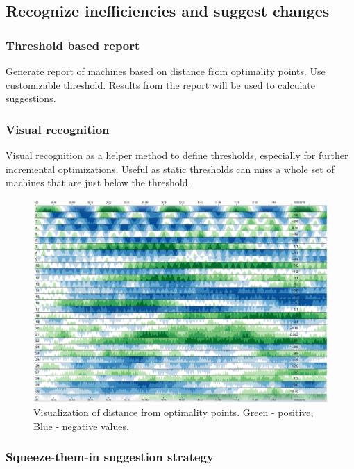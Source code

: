 \documentclass[]{final_report}
\begin{document}
\subsection{Recognize inefficiencies and suggest changes}

\subsubsection{Threshold based report}

Generate report of machines based on distance from optimality points. Use customizable threshold. 
Results from the report will be used to calculate suggestions.

\subsubsection{Visual recognition}

Visual recognition as a helper method to define thresholds, especially for further incremental optimizations. 
Useful as static thresholds can miss a whole set of machines that are just below the threshold. 


\begin{figure}[H]
       \includegraphics[width=\linewidth]{figures/cubism}
      \caption{Visualization of distance from optimality points. Green - positive, Blue - negative values.}
        \label{fig:cubism}
\end{figure}

\subsubsection{Squeeze-them-in suggestion strategy}
\end{document}
